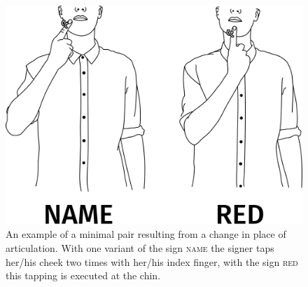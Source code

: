 \begin{figure}[bt]
\centering
	\includegraphics[width=1.0\textwidth]{minimalpair2}
	\caption{An example of a minimal pair resulting from a change in place of articulation. With one variant of the sign \textsc{name} the signer taps her/his cheek two times with her/his index finger, with the sign \textsc{red} this tapping is executed at the chin.}
	\label{minimalpairtwo}
\end{figure}

